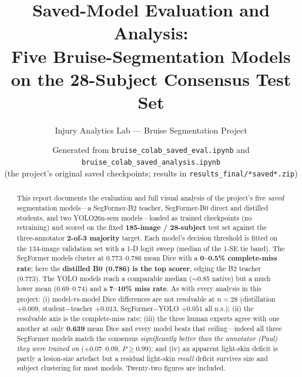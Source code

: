 \documentclass[11pt]{article}
\title{\bfseries Saved-Model Evaluation and Analysis:\\
Five Bruise-Segmentation Models on the 28-Subject Consensus Test Set}
\author{Injury Analytics Lab --- Bruise Segmentation Project}
\date{Generated from \texttt{bruise\_colab\_saved\_eval.ipynb} and
\texttt{bruise\_colab\_saved\_analysis.ipynb}\\
(the project's original saved checkpoints; results in
\texttt{results\_final/*saved*.zip})}
\newcommand{\ns}{n.s.}
\begin{document}
\maketitle

\begin{abstract}
\noindent
This report documents the evaluation and full visual analysis of the project's five
\emph{saved} segmentation models---a SegFormer-B2 teacher, SegFormer-B0 direct and
distilled students, and two YOLO26n-sem models---loaded as trained checkpoints (no
retraining) and scored on the fixed \textbf{185-image / 28-subject} test set against the
three-annotator \textbf{2-of-3 majority} target. Each model's decision threshold is fitted
on the 134-image validation set with a 1-D logit sweep (median of the 1-SE tie band). The
SegFormer models cluster at $0.773$--$0.786$ mean Dice with a \textbf{0--0.5\% complete-miss
rate}; here the \textbf{distilled B0 (0.786) is the top scorer}, edging the B2 teacher
(0.773). The YOLO models reach a comparable median ($\sim$0.85 native) but a much lower mean
(0.69--0.74) and a \textbf{7--10\% miss rate}. As with every analysis in this project: (i)
model-vs-model Dice differences are not resolvable at $n=28$ (distillation $+0.009$,
student$-$teacher $+0.013$, SegFormer$-$YOLO $+0.051$ all \ns); (ii) the resolvable axis is
the complete-miss rate; (iii) the three human experts agree with one another at only
\textbf{0.639} mean Dice and every model beats that ceiling---indeed all three SegFormer
models match the consensus \emph{significantly better than the annotator (Paul) they were
trained on} ($+0.07$--$0.09$, $P{\ge}0.99$); and (iv) an apparent light-skin deficit is
partly a lesion-size artefact but a residual light-skin \emph{recall} deficit survives size
and subject clustering for most models. Twenty-two figures are included.
\end{abstract}

\tableofcontents
\bigskip

\end{document}
